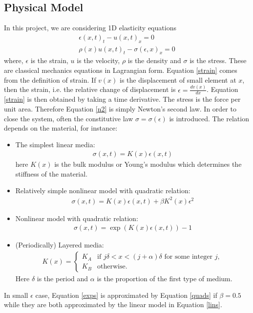 \documentclass{article}
\begin{document}
\subsection{Physical Model}
In this project, we are considering 1D elasticity equations
\begin{align}
\epsilon(x,t)_t-u(x,t)_x=0 \label{strain}\\
\rho(x) u(x,t)_t-\sigma(\epsilon,x)_x=0 \label{n2}
\end{align}
where, $\epsilon$ is the strain, $u$ is the velocity, $\rho$ is the density and $\sigma$ is the stress. These are classical mechanics equations in Lagrangian form. Equation \eqref{strain} comes from the definition of strain. If $v(x)$ is the displacement of small element at $x$, then the strain, i.e. the relative change of displacement is $\epsilon=\frac{dv(x)}{dx}$. Equation \eqref{strain} is then obtained by taking a time derivative. The stress is the force per unit area. Therefore Equation \eqref{n2} is simply Newton's second law. In order to close the system, often the constitutive law $\sigma=\sigma(\epsilon)$ is introduced. The relation depends on the material, for instance:
\begin{itemize}
\item The simplest linear media:
\begin{align}
\sigma(x,t)=K(x)\epsilon(x,t)
\label{lins}
\end{align}
here $K(x)$ is the bulk modulus or Young's modulus which determines the stiffness of the material.
\item Relatively simple nonlinear model with quadratic relation:
\begin{align}
\sigma(x,t)=K(x)\epsilon(x,t)+\beta K^2(x)\epsilon^2
\label{quads}
\end{align}
\item Nonlinear model with quadratic relation:
\begin{align}
\sigma(x,t)=\exp(K(x)\epsilon(x,t))-1
\label{exps}
\end{align}
\item (Periodically) Layered media:
\begin{align}
K(x)=\left\{
\begin{array}{cc}
K_A & \mbox{if }j\delta<x<(j+\alpha)\delta \mbox{ for some integer } j,\\
K_B & \mbox{otherwise.}
\end{array}
\right.
\end{align}
Here $\delta$ is the period and $\alpha$ is the proportion of the first type of medium.
\end{itemize}
In small $\epsilon$ case, Equation \eqref{exps} is approximated by Equation \eqref{quads} if $\beta=0.5$ while they are both approximated by the linear model in Equation \eqref{lins}.
\end{document}

